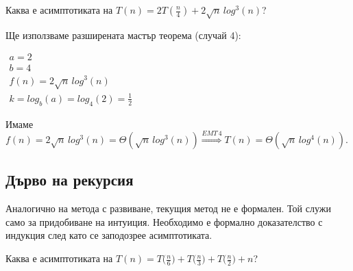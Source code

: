 \begin{problem}
	Каква е асимптотиката на $T(n)=2T(\frac n4)+2\sqrt n\,log^3(n)$?
\end{problem}

\begin{solution}
	Ще използваме $\hyperref[th:extended-master-theorem]{\text{разширената мастър теорема}}$ (случай 4):
	\begin{center}
		$\begin{array}{|l}
			a=2\\
			b=4\\
			f(n)=2\sqrt n\,log^3(n)\\
			k=log_b(a)=log_4(2)=\frac12
		\end{array}$
	\end{center}
	Имаме $f(n)=2\sqrt n\,log^3(n)=\Theta(\sqrt n\,log^3(n))\overset{EMT\,4}{\Longrightarrow}T(n)=\Theta(\sqrt n\,log^4(n))$.
\end{solution}\leavevmode\newline


\subsection{Дърво на рекурсия}

Аналогично на метода с развиване, текущия метод не е формален. Той служи само за придобиване на интуиция. Необходимо е формално доказателство с индукция след като се заподозрее асимптотиката.

\begin{problem}
	Каква е асимптотиката на $T(n)=T\big(\frac n6\big)+T\big(\frac n3\big)+T\big(\frac n2\big)+n$?
\end{problem}

